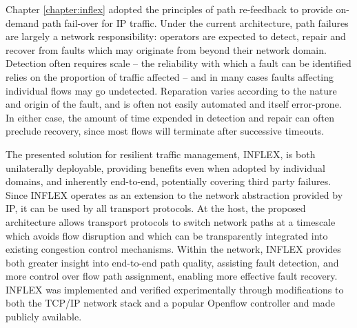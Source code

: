 Chapter \ref{chapter:inflex} adopted the principles of path re-feedback to provide on-demand path fail-over for \ac{IP} traffic.
Under the current architecture, path failures are largely a network responsibility: operators are expected to detect, repair and recover from faults which may originate from beyond their network domain.
Detection often requires scale -- the reliability with which a fault can be identified relies on the proportion of traffic affected -- and in many cases faults affecting individual flows may go undetected.
Reparation varies according to the nature and origin of the fault, and is often not easily automated and itself error-prone.
In either case, the amount of time expended in detection and repair can often preclude recovery, since most flows will terminate after successive timeouts.

The presented solution for resilient traffic management, INFLEX, is both unilaterally deployable, providing benefits even when adopted by individual domains, and inherently end-to-end, potentially covering third party failures.
Since INFLEX operates as an extension to the network abstraction provided by \ac{IP}, it can be used by all transport protocols.
At the host, the proposed architecture allows transport protocols to switch network paths at a timescale which avoids flow disruption and which can be transparently integrated into existing congestion control mechanisms.
Within the network, INFLEX provides both greater insight into end-to-end path quality, assisting fault detection, and more control over flow path assignment, enabling more effective fault recovery. 
INFLEX was implemented and verified experimentally through modifications to both the \ac{TCP}/\ac{IP} network stack and a popular Openflow controller \cite{pox} and made publicly available.

